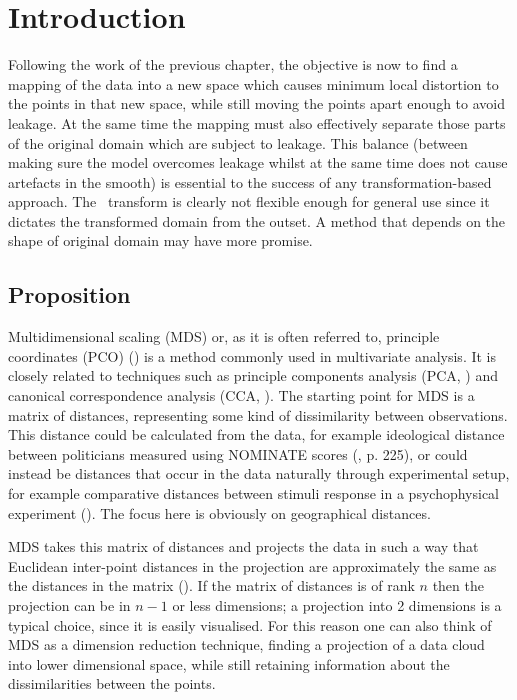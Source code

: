 \label{chap-mds}
\section{Introduction}

Following the work of the previous chapter, the objective is now to find a mapping of the data into a new space which causes minimum local distortion to the points in that new space, while still moving the points apart enough to avoid leakage. At the same time the mapping must also effectively separate those parts of the original domain which are subject to leakage. This balance (between making sure the model overcomes leakage whilst at the same time does not cause artefacts in the smooth) is essential to the success of any transformation-based approach. The \sch\ transform is clearly not flexible enough for general use since it dictates the transformed domain from the outset. A method that depends on the shape of original domain may have more promise.

\subsection{Proposition}

Multidimensional scaling (MDS) or, as it is often referred to, principle coordinates (PCO) (\cite{gower1966}) is a method commonly used in multivariate analysis. It is closely related to techniques such as principle components analysis (PCA, \cite[p. 200]{chatfieldcollins}) and canonical correspondence analysis (CCA, \cite{terbraak}). The starting point for MDS is a matrix of distances, representing some kind of dissimilarity between observations. This distance could be calculated from the data, for example ideological distance between politicians measured using NOMINATE scores (\cite{quantss}, p. 225), or could instead be distances that occur in the data naturally through experimental setup,  for example comparative distances between stimuli response in a psychophysical experiment (\cite{torgerson}). The focus here is obviously on geographical distances.

MDS takes this matrix of distances and projects the data in such a way that Euclidean inter-point distances in the projection are approximately the same as the distances in the matrix (\cite[p. 187]{chatfieldcollins}). If the matrix of distances is of rank $n$ then the projection can be in $n-1$ or less dimensions; a projection into 2 dimensions is a typical choice, since it is easily visualised. For this reason one can also think of MDS as a dimension reduction technique, finding a projection of a data cloud into lower dimensional space, while still retaining information about the dissimilarities between the points.

